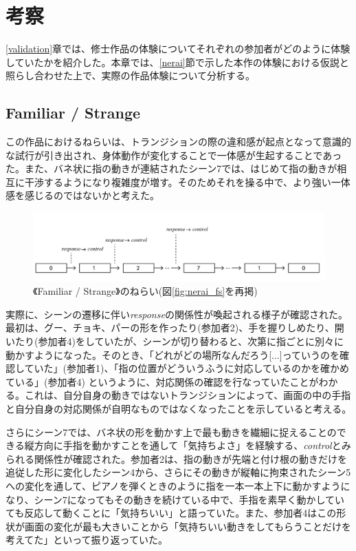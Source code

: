 \chapter{考察}
\label{考察}
\ref{validation}章では、修士作品の体験についてそれぞれの参加者がどのように体験していたかを紹介した。本章では、\ref{nerai}節で示した本作の体験における仮説と照らし合わせた上で、実際の作品体験について分析する。

\section{Familiar / Strange}
この作品におけるねらいは、トランジションの際の違和感が起点となって意識的な試行が引き出され、身体動作が変化することで一体感が生起することであった。また、バネ状に指の動きが連結されたシーン7では、はじめて指の動きが相互に干渉するようになり複雑度が増す。そのためそれを操る中で、より強い一体感を感じるのではないかと考えた。

\begin{figure}[H]
  \centering
  \includegraphics[width=15cm]{img/nerai_fs.png}
  \caption{《Familiar / Strange》のねらい(図\ref{fig:nerai_fs}を再掲)}
  \label{fig:nerai_fs_in_discussion}
\end{figure}

実際に、シーンの遷移に伴い\textit{response}の関係性が喚起される様子が確認された。
最初は、グー、チョキ、パーの形を作ったり(参加者2)、手を握りしめたり、開いたり(参加者4)をしていたが、シーンが切り替わると、次第に指ごとに別々に動かすようになった。そのとき、「どれがどの場所なんだろう[...]っていうのを確認していた」(参加者1)、「指の位置がどういうふうに対応しているのかを確かめている」(参加者4)
というように、対応関係の確認を行なっていたことがわかる。これは、自分自身の動きではないトランジションによって、画面の中の手指と自分自身の対応関係が自明なものではなくなったことを示していると考える。

さらにシーン7では、バネ状の形を動かす上で最も動きを繊細に捉えることのできる縦方向に手指を動かすことを通して「気持ちよさ」を経験する、\textit{control}とみられる関係性が確認された。参加者2は、指の動きが先端と付け根の動きだけを追従した形に変化したシーン4から、さらにその動きが縦軸に拘束されたシーン5への変化を通して、ピアノを弾くときのように指を一本一本上下に動かすようになり、シーン7になってもその動きを続けている中で、手指を素早く動かしていても反応して動くことに「気持ちいい」と語っていた。また、参加者4はこの形状が画面の変化が最も大きいことから「気持ちいい動きをしてもらうことだけを考えてた」といって振り返っていた。

